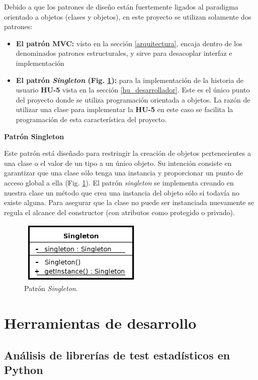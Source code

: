 Debido a que los patrones de diseño están fuertemente ligados al paradigma orientado a objetos (clases y objetos), en este proyecto se utilizan solamente dos patrones:
\begin{itemize}
\item \textbf{El patrón MVC:} visto en la sección \ref{arquitectura}, encaja dentro de los denominados patrones estructurales, y sirve para desacoplar interfaz e implementación
\item \textbf{El patrón \textit{Singleton} (Fig. \ref{fig:singleton}):} para la implementación de la historia de usuario \textbf{HU-5} vista en la sección \ref{hu_desarrollador}. Este es el único punto del proyecto donde se utiliza programación orientada a objetos. La razón de utilizar una clase para implementar la \textbf{HU-5} en este caso se facilita la programación de esta característica del proyecto.
\end{itemize}

\noindent
\textbf{Patrón Singleton}

Este patrón está diseñado para restringir la creación de objetos pertenecientes a una clase o el valor de un tipo a un único objeto. Su intención consiste en garantizar que una clase sólo tenga una instancia y proporcionar un punto de acceso global a ella (Fig. \ref{fig:singleton}). El patrón \textit{singleton} se implementa creando en nuestra clase un método que crea una instancia del objeto sólo si todavía no existe alguna. Para asegurar que la clase no puede ser instanciada nuevamente se regula el alcance del constructor (con atributos como protegido o privado).

\begin{figure}[H]
\centering
\includegraphics[width=6cm,height=3cm]{figuras/singleton.png}
\caption{Patrón \textit{Singleton}.}
\label{fig:singleton}
\end{figure}

\section{Herramientas de desarrollo}

\subsection{Análisis de librerías de test estadísticos en Python} \label{libreriastest}

